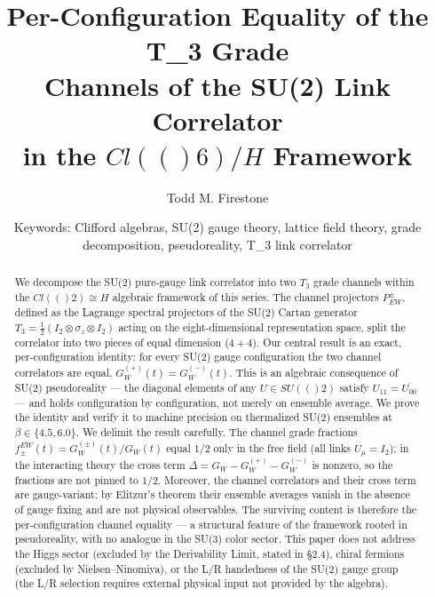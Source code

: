 \documentclass[12pt,a4paper]{article}
\newcommand{\Cl}{\mathrm{Cl}}
\newcommand{\SU}{\mathrm{SU}}
\newcommand{\HH}{\mathbb{H}}
\newcommand{\Pew}[1]{P^{#1}_{\mathrm{EW}}}
\newcommand{\fEW}[1]{f_{#1}^{\mathrm{EW}}}
\def\Cl#1{Cl(#1)}%
\def\SU#1{SU(#1)}%
\def\HH{H}%
\def\mathbb#1{#1}%
\def\mathrm#1{#1}%
\def\textsubscript#1{_#1}%
\begin{document}
	
	\title{\textbf{Per-Configuration Equality of the T\textsubscript{3} Grade\\ 
			Channels of the SU(2) Link Correlator\\
			in the $\Cl(6)/\HH$ Framework}\\[6pt]}
	
	\author{Todd M. Firestone}
	
	\date{Keywords: Clifford algebras, SU(2) gauge theory, lattice field theory,
		grade decomposition, pseudoreality, T\textsubscript{3} link correlator}
	
	\maketitle

	
	\begin{abstract}
		We decompose the SU(2) pure-gauge link correlator into two $T_3$ grade
		channels within the $\Cl(2)\cong\HH$ algebraic framework of this series.
		The channel projectors $\Pew{\pm}$, defined as the Lagrange spectral
		projectors of the SU(2) Cartan generator
		$T_3 = \tfrac{1}{2}(I_2\otimes\sigma_z\otimes I_2)$ acting on the
		eight-dimensional representation space, split the correlator into two pieces
		of equal dimension ($4+4$).  Our central result is an exact, per-configuration
		identity: for every SU(2) gauge configuration the two channel correlators are
		equal, $G_W^{(+)}(t)=G_W^{(-)}(t)$.  This is an algebraic consequence of SU(2)
		pseudoreality --- the diagonal elements of any $U\in\SU(2)$ satisfy
		$U_{11}=\overline{U_{00}}$ --- and holds configuration by configuration, not
		merely on ensemble average.  We prove the identity and verify it to machine
		precision on thermalized SU(2) ensembles at $\beta\in\{4.5,6.0\}$.  We delimit
		the result carefully.  The channel grade fractions
		$\fEW{\pm}(t)=G_W^{(\pm)}(t)/G_W(t)$ equal $1/2$ only in the free field
		(all links $U_\mu=I_2$); in the interacting theory the cross term
		$\Delta=G_W-G_W^{(+)}-G_W^{(-)}$ is nonzero, so the fractions are not pinned
		to $1/2$.  Moreover, the channel correlators and their cross term are
		gauge-variant: by Elitzur's theorem their ensemble averages vanish in the
		absence of gauge fixing and are not physical observables.  The surviving
		content is therefore the per-configuration channel equality --- a structural
		feature of the framework rooted in pseudoreality, with no analogue in the
		SU(3) color sector.  This paper does not address the Higgs sector (excluded by
		the Derivability Limit, stated in \S2.4), chiral fermions (excluded by
		Nielsen--Ninomiya), or the L/R handedness of the SU(2) gauge group (the L/R
		selection requires external physical input not provided by the algebra).
	\end{abstract}
	
\end{document}
